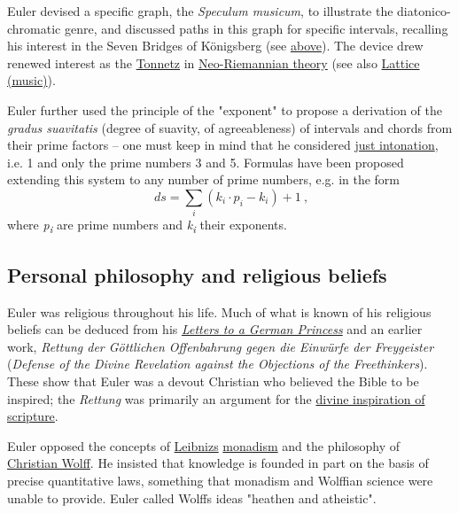 Euler devised a specific graph, the \emph{Speculum musicum}, to illustrate the diatonico-chromatic genre, and discussed paths in this graph for specific intervals, recalling his interest in the Seven Bridges of Königsberg (see \href{https://en.wikipedia.org/wiki/Leonhard_Euler\#Graph_theory}{above}). The device drew renewed interest as the \href{https://en.wikipedia.org/wiki/Tonnetz}{Tonnetz} in \href{https://en.wikipedia.org/wiki/Neo-Riemannian_theory}{Neo-Riemannian theory} (see also \href{https://en.wikipedia.org/wiki/Lattice_(music)}{Lattice (music)}).

Euler further used the principle of the "exponent" to propose a derivation of the \emph{gradus suavitatis} (degree of suavity, of agreeableness) of intervals and chords from their prime factors -- one must keep in mind that he considered \href{https://en.wikipedia.org/wiki/Just_intonation}{just intonation}, i.e. 1 and only the prime numbers 3 and 5. Formulas have been proposed extending this system to any number of prime numbers, e.g. in the form
{{\[\ ds = \sum\limits_{i}\left( {k_{i} \cdot p_{i} - k_{i}} \right) + 1\ ,\]}{}}
where {\emph{p}\textsubscript{\emph{i}}} are prime numbers and {\emph{k}\textsubscript{\emph{i}}} their exponents.


\subsection{Personal philosophy and religious beliefs}\label{Personal_philosophy_and_religious_beliefs}

Euler was religious throughout his life. Much of what is known of his religious beliefs can be deduced from his \emph{\href{https://en.wikipedia.org/wiki/Letters_to_a_German_Princess}{Letters to a German Princess}} and an earlier work, \emph{Rettung der Göttlichen Offenbahrung gegen die Einwürfe der Freygeister} (\emph{Defense of the Divine Revelation against the Objections of the Freethinkers}). These show that Euler was a devout Christian who believed the Bible to be inspired; the \emph{Rettung} was primarily an argument for the \href{https://en.wikipedia.org/wiki/Biblical_inspiration}{divine inspiration of scripture}.

Euler opposed the concepts of \href{https://en.wikipedia.org/wiki/Gottfried_Leibniz}{Leibniz\textquotesingle s} \href{https://en.wikipedia.org/wiki/Monadism}{monadism} and the philosophy of \href{https://en.wikipedia.org/wiki/Christian_Wolff_(philosopher)}{Christian Wolff}. He insisted that knowledge is founded in part on the basis of precise quantitative laws, something that monadism and Wolffian science were unable to provide. Euler called Wolff\textquotesingle s ideas "heathen and atheistic".

